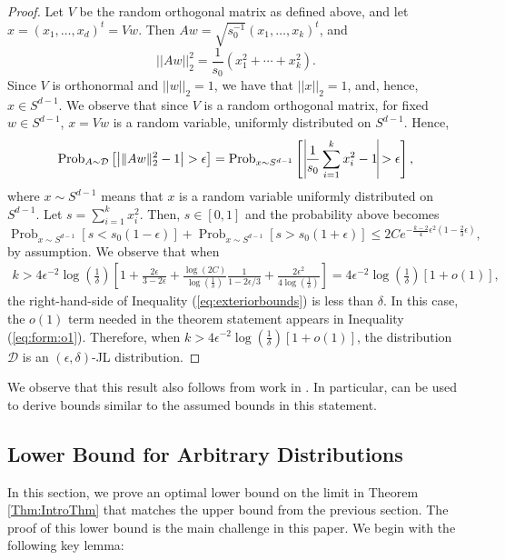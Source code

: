 \documentclass[twoside,11pt]{article}
\newcommand{\D}{\mathcal{D}}
\newcommand{\pPP}[2]{\operatorname{Prob}_{#2} \left[ #1 \right] }
\begin{document}
\begin{proof}
Let $V$ be the random orthogonal matrix as defined above, and let $x =(x_1, \ldots, x_d)^t = Vw$. Then $Aw = \sqrt{s_0^{-1}} (x_1, \ldots, x_k)^t$, and
\[ ||Aw||_2^2 = \frac{1}{s_0} (x_1^2 + \cdots+ x_k^2).\]
Since $V$ is orthonormal and $||w||_2 =1$, we have that $||x||_2 =1$, and, hence, $x \in S^{d-1}$.  We observe that since $V$ is a random orthogonal matrix, for fixed $w\in S^{d-1}$, $x=Vw$ is a random variable, uniformly distributed on $S^{d-1}$.
Hence, 
\[\pPP{\left| \|Aw\|^2_2-1 \right|> \epsilon}{A\sim\D} = \pPP{ \, \vline \frac{1}{s_0}\sum_{i=1}^k x_i^2 -1 \vline > \epsilon}{x\sim S^{d-1}},\]
where $x\sim S^{d-1}$ means that $x$ is a random variable uniformly distributed on $S^{d-1}$.  Let $s= \sum_{i=1}^k x_i^2$. Then, $s \in [0,1]$ and the probability above becomes
\begin{equation}\label{eq:exteriorbounds}
\pPP{ s < s_0(1-\epsilon)}{x\sim S^{d-1}}
				+ \pPP{ s> s_0(1+\epsilon)}{x\sim S^{d-1}}\leq 2Ce^{-\frac{k-2}{4}\epsilon^2\left(1-\frac{2}{3}\epsilon\right)},\end{equation}
by assumption.  We observe that when 
\begin{align}k > 4\epsilon^{-2} \log \left(\frac{1}{\delta} \right)\left[1+ \frac{2\epsilon}{3-2\epsilon} + \frac{\log(2C)}{\log\left( \frac{1}{\delta}\right)} \frac{1}
			{1-2\epsilon/3 }+ \frac{2\epsilon^2}{4\log \left(\frac{1}{\delta}\right)}\right] = 4\epsilon^{-2} \log \left(\frac{1}{\delta} \right)\left[1+o(1)\right] , \label{eq:form:o1} \end{align}
the right-hand-side of Inequality (\ref{eq:exteriorbounds}) is less than $\delta$.
In this case, the $o(1)$ term needed in the theorem statement appears in Inequality (\ref{eq:form:o1}).  Therefore, when $k>  4\epsilon^{-2} \log \left(\frac{1}{\delta} \right)\left[1+o(1)\right] $, 
		the distribution $\D$  is an $(\epsilon, \delta)$-JL distribution.	
\end{proof}

We observe that this result also follows from work in \cite{DasguptaGupta}.  In particular, \cite[Lemma 2.2]{DasguptaGupta} can be used to derive bounds similar to the assumed bounds in this statement.

\subsection{Lower Bound for Arbitrary Distributions} 

In this section, we prove an optimal lower bound on the limit in Theorem \ref{Thm:IntroThm} that matches the upper bound from the previous section.  The proof of this lower bound is the main challenge in this paper.  We begin with the following key lemma:
\end{document}
